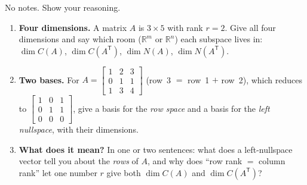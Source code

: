 \documentclass[10pt]{article}
\newcommand{\T}{\mathsf{T}}
\begin{document}
\namedateperiod

\vspace{0.15in}

No notes. Show your reasoning.

\begin{enumerate}[leftmargin=1.8em, itemsep=16pt]
  \item \textbf{Four dimensions.} A matrix $A$ is $3\times 5$ with rank $r=2$. Give all four dimensions and
        say which room ($\mathbb{R}^m$ or $\mathbb{R}^n$) each subspace lives in:
        $\dim C(A)$, $\dim C(A^{\T})$, $\dim N(A)$, $\dim N(A^{\T})$.
  \item \textbf{Two bases.} For $A=\begin{bmatrix} 1 & 2 & 3 \\ 0 & 1 & 1 \\ 1 & 3 & 4 \end{bmatrix}$ (row~3 $=$
        row~1 $+$ row~2), which reduces to $\begin{bmatrix} 1 & 0 & 1 \\ 0 & 1 & 1 \\ 0 & 0 & 0 \end{bmatrix}$,
        give a basis for the \emph{row space} and a basis for the \emph{left nullspace}, with their dimensions.
  \item \textbf{What does it mean?} In one or two sentences: what does a left-nullspace vector tell you about
        the \emph{rows} of $A$, and why does ``row rank $=$ column rank'' let one number $r$ give both
        $\dim C(A)$ and $\dim C(A^{\T})$?
\end{enumerate}
\end{document}
